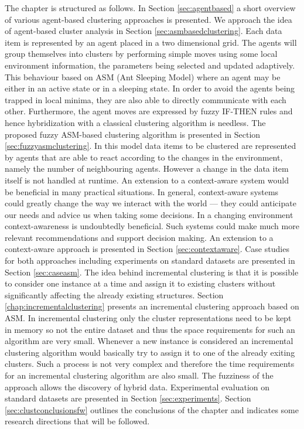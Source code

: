 The chapter is structured as follows. In Section \ref{sec:agentbased} a short overview of various agent-based clustering approaches is presented. 
We approach the idea of agent-based cluster analysis in Section \ref{sec:asmbasedclustering}. Each data item is represented by an agent placed in a two dimensional grid. The agents will group themselves into clusters by performing simple moves using some local environment information, the parameters being selected and updated adaptively. This behaviour based on ASM (Ant Sleeping Model) where an agent may be either in an active state or in a sleeping state. In order to avoid the agents being trapped in local minima, they are also able to directly communicate with each other. Furthermore, the agent moves are expressed by fuzzy IF-THEN rules and hence hybridization with a classical clustering algorithm is needless. The proposed fuzzy ASM-based clustering  algorithm is presented in Section \ref{sec:fuzzyasmclustering}. 
In this model data items to be clustered are represented by agents that are able to react according to the changes in the environment, namely the number of neighbouring agents. However a change in the data item itself is not handled at runtime. An extension to a context-aware system would be beneficial in many practical situations. 
In general, context-aware systems could greatly change the way we interact with the world --- they could anticipate our needs and advice us when taking some decisions. In a changing environment context-awareness is undoubtedly beneficial.  Such systems could make much more relevant recommendations and support decision making. An extension to a context-aware approach is presented in Section \ref{sec:contextaware}. Case studies for both approaches including experiments on standard datasets \cite{website:iris, website:wine} are presented in Section \ref{sec:caseasm}.
The idea behind incremental clustering is that it is possible to consider one instance at a time and assign it to existing clusters without significantly affecting the already existing structures. Section \ref{chap:incrementalclustering} presents an incremental clustering approach based on ASM. In incremental clustering only the cluster representations need to be kept in memory so not the entire dataset and thus the space requirements for such an algorithm are very small. Whenever a new instance is considered an incremental clustering algorithm would basically try to assign it to one of the already exiting clusters. Such a process is not very complex and therefore the time requirements for an incremental clustering algorithm are also small. The fuzziness of the approach allows the discovery of hybrid data. Experimental evaluation on standard datasets \cite{website:iris, website:wine} are presented in Section \ref{sec:experiments}. Section \ref{sec:clustconclusionsfw} outlines the conclusions of the chapter and indicates some research directions that will be followed.

